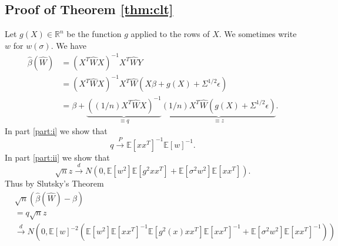 \documentclass[ejs,ps,preprint]{imsart}
\numberwithin{equation}{section}
\theoremstyle{plain}
\newcommand{\E}{\mathbb{E}}
\newcommand{\rightarrowp}{\overset{P}{\to}}
\newcommand{\rightarrowd}{\overset{d}{\to}}
\def\E{\mathbb{E}}
\begin{document}
\subsection{Proof of Theorem \ref{thm:clt}}
\label{prf:clt}
Let $g(X) \in \mathbb{R}^n$ be the function $g$ applied to the rows of $X$. We sometimes write $w$ for $w(\sigma)$. We have
\begin{align*}
\widehat{\beta}(\widehat{W}) &= (X^T\widehat{W}X)^{-1}X^T\widehat{W}Y\\
&= (X^T\widehat{W}X)^{-1}X^T\widehat{W}(X\beta + g(X) + \Sigma^{1/2}\epsilon)\\
&= \beta + \underbrace{((1/n)X^T\widehat{W}X)^{-1}}_{\equiv q}\underbrace{(1/n)X^T\widehat{W}(g(X) + \Sigma^{1/2}\epsilon)}_{\equiv z}.
\end{align*}
In part \ref{part:i} we show that 
\begin{equation*}
q \rightarrowp \E[xx^T]^{-1}\E[w]^{-1}.
\end{equation*}
In part \ref{part:ii} we show that
\begin{equation*}
\sqrt{n}z \rightarrowd N(0,\E[w^2]\E[g^2xx^T] + \E[\sigma^2w^2]\E[xx^T]).
\end{equation*}
Thus by Slutsky's Theorem
\begin{align*}
  &\sqrt{n}(\widehat{\beta}(\widehat{W}) - \beta) \\
  &= q\sqrt{n}z \\
&\rightarrowd N\left(0,\E[w]^{-2}(\E[w^2]\E[xx^T]^{-1}\E[g^2(x)xx^T]\E[xx^T]^{-1} + \E[\sigma^2w^2]\E[xx^T]^{-1})\right)
\end{align*}
\end{document}
